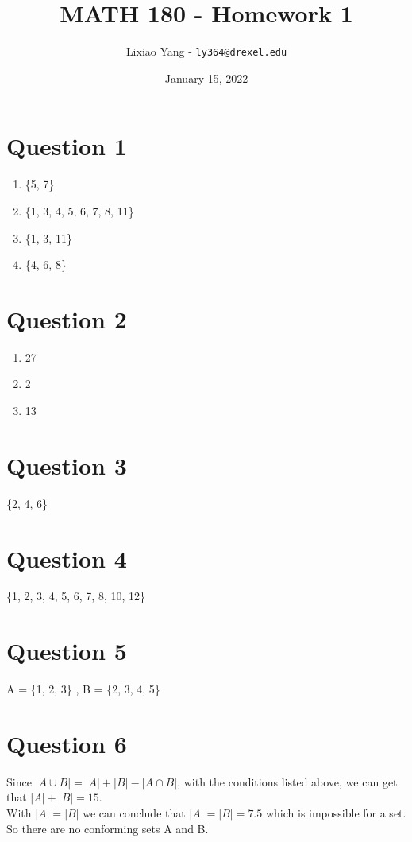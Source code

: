 \documentclass[11pt, oneside]{article}   	%
\title{\bf MATH 180 - Homework 1}
\author{Lixiao Yang - \texttt{ly364@drexel.edu}}
\date{January 15, 2022}							%
\begin{document}
\maketitle

\section*{Question 1}

	\begin{enumerate}
		\item \{5, 7\}
		\item \{1, 3, 4, 5, 6, 7, 8, 11\}
		\item \{1, 3, 11\} 
		\item \{4, 6, 8\} 
	\end{enumerate}

\section*{Question 2}

	\begin{enumerate}
		\item 27
		\item 2
		\item 13
	\end{enumerate}

\section*{Question 3}

	\{2, 4, 6\} 

\section*{Question 4}

	\{1, 2, 3, 4, 5, 6, 7, 8, 10, 12\} 

\section*{Question 5}

	A = \{1, 2, 3\} , B = \{2, 3, 4, 5\} 

\section*{Question 6}

	Since $\left\lvert A \cup B \right\rvert = \left\lvert A \right\rvert + \left\lvert B\right\rvert  - \left\lvert A\cap B\right\rvert$, 
	with the conditions listed above, we can get that $\left\lvert A\right\rvert  + \left\lvert B\right\rvert  = 15$.\\
	With $\left\lvert A\right\rvert  = \left\lvert B\right\rvert $ we can conclude that $\left\lvert A\right\rvert  = \left\lvert B\right\rvert = 7.5$
	which is impossible for a set.\\ So there are no conforming sets A and B.
\end{document}
